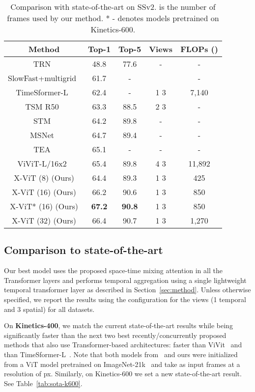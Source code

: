 \documentclass{article}
\begin{document}
\begin{table}[ht!]
    \caption{Comparison with state-of-the-art on SSv2.  is the number of frames used by our method. * - denotes models pretrained on Kinetics-600.}\label{tab:SSv2-sota}
    
    \centering
    \begin{tabular}{ccccc}
        \toprule
       Method &  Top-1 & Top-5 & Views & FLOPs () \\
       \midrule
       TRN~\citep{zhou2018temporal} & 48.8 & 77.6 & - & - \\
       SlowFast+multigrid~\citep{wu2020multigrid} & 61.7 & - &   & - \\
       TimeSformer-L~\citep{bertasius2021space} & 62.4 & - & 1  3 & 7,140  \\
       TSM R50~\citep{lin2019tsm} & 63.3 & 88.5 & 2  3 & - \\
       STM~\citep{jiang2019stm} & 64.2 & 89.8 & - & - \\
       MSNet~\citep{kwon2020motionsqueeze} & 64.7 & 89.4 & - & - \\
       TEA~\citep{li2020tea} & 65.1 & - & - & -\\
       ViViT-L/16x2~\citep{bertasius2021space} & 65.4 & 89.8 & 4  3 & 11,892 \\
       \midrule
       X-ViT (8) (Ours) & 64.4 & 89.3 & 1  3 & 425 \\
       X-ViT (16) (Ours) & 66.2 & 90.6 & 1  3 & 850 \\
       X-ViT* (16) (Ours) & \textbf{67.2} & \textbf{90.8} & 1  3 & 850 \\
       X-ViT (32) (Ours) & 66.4 & 90.7 & 1  3 & 1,270 \\
        \bottomrule
    \end{tabular}
\end{table}


\subsection{Comparison to state-of-the-art}\label{ssec:results-sota}

Our best model uses the proposed space-time mixing attention in all the Transformer layers and performs temporal aggregation using a single lightweight temporal transformer layer as described in Section~\ref{sec:method}. Unless otherwise specified, we report the results using the  configuration for the views (1 temporal and 3 spatial) for all datasets.

On \textbf{Kinetics-400},  we match the current state-of-the-art results while being significantly faster than the next two best recently/concurrently proposed methods that also use Transformer-based architectures:  faster than ViVit~\citep{arnab2021vivit} and  than TimeSformer-L~\citep{bertasius2021space}. Note that both models from~\citep{arnab2021vivit,bertasius2021space} and ours were initialized from a ViT model pretrained on ImageNet-21k~\citep{deng2009imagenet} and take as input frames at a resolution of px. Similarly, on Kinetics-600 we set a new state-of-the-art result. See Table~\ref{tab:sota-k600}.
\end{document}

